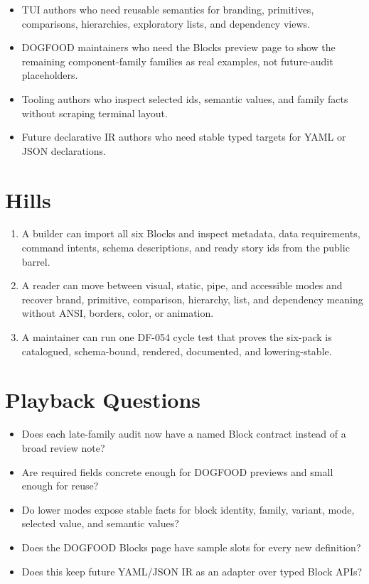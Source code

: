 \begin{itemize}
\tightlist
\item
  TUI authors who need reusable semantics for branding, primitives, comparisons, hierarchies, exploratory lists, and dependency views.
\item
  DOGFOOD maintainers who need the Blocks preview page to show the remaining component-family families as real examples, not future-audit placeholders.
\item
  Tooling authors who inspect selected ids, semantic values, and family facts without scraping terminal layout.
\item
  Future declarative IR authors who need stable typed targets for YAML or JSON declarations.
\end{itemize}

\section{Hills}\label{record-099-hills}

\begin{enumerate}
\def\labelenumi{\arabic{enumi}.}
\tightlist
\item
  A builder can import all six Blocks and inspect metadata, data requirements, command intents, schema descriptions, and ready story ids from the public barrel.
\item
  A reader can move between visual, static, pipe, and accessible modes and recover brand, primitive, comparison, hierarchy, list, and dependency meaning without ANSI, borders, color, or animation.
\item
  A maintainer can run one DF-054 cycle test that proves the six-pack is catalogued, schema-bound, rendered, documented, and lowering-stable.
\end{enumerate}

\section{Playback Questions}\label{record-099-playback-questions}

\begin{itemize}
\tightlist
\item
  Does each late-family audit now have a named Block contract instead of a broad review note?
\item
  Are required fields concrete enough for DOGFOOD previews and small enough for reuse?
\item
  Do lower modes expose stable facts for block identity, family, variant, mode, selected value, and semantic values?
\item
  Does the DOGFOOD Blocks page have sample slots for every new definition?
\item
  Does this keep future YAML/JSON IR as an adapter over typed Block APIs?
\end{itemize}

